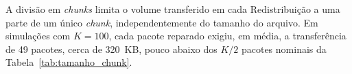 A divisão em \emph{chunks} limita o volume transferido em cada Redistribuição a uma parte de um único \emph{chunk}, independentemente do tamanho do arquivo. Em simulações com $K = 100$, cada pacote reparado exigiu, em média, a transferência de 49 pacotes, cerca de 320~KB, pouco abaixo dos $K/2$ pacotes nominais da Tabela~\ref{tab:tamanho_chunk}.

